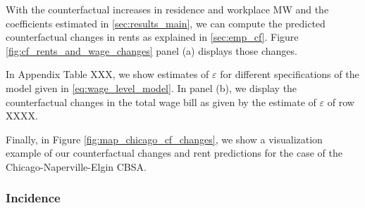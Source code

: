 With the counterfactual increases in residence and workplace MW and the 
coefficients estimated in \ref{sec:results_main}, we can compute the predicted 
counterfactual changes in rents as explained in \ref{sec:emp_cf}. Figure 
\ref{fig:cf_rents_and_wage_changes} panel (a) displays those changes. 


In Appendix Table XXX, we show estimates of $\varepsilon$ for different specifications of 
the model given in \ref{eq:wage_level_model}. In panel (b), we display the counterfactual 
changes in the total wage bill as given by the estimate of $\varepsilon$ of row XXXX.


Finally, in Figure \ref{fig:map_chicago_cf_changes}, we show a visualization example 
of our counterfactual changes and rent predictions for the case of the 
Chicago-Naperville-Elgin CBSA. 


\subsubsection{Incidence}







